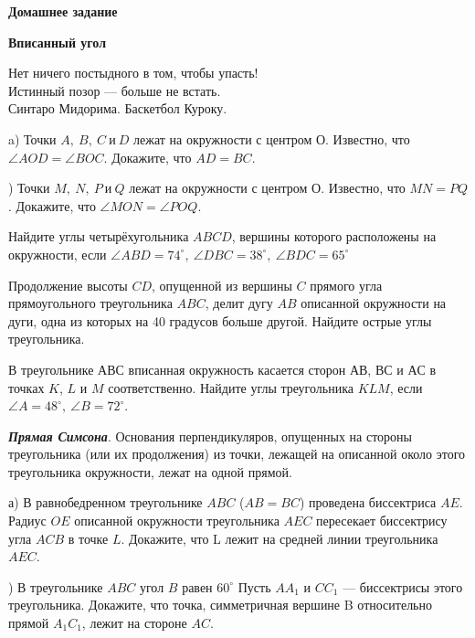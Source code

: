 \centerline{\bf \Huge Домашнее задание}
\centerline{\bf \Huge Вписанный угол}

\begin{flushright}
        \scriptsize{Нет ничего постыдного в том, чтобы упасть!\\ Истинный позор — больше не встать.\\ Синтаро Мидорима. Баскетбол Куроку.}
\end{flushright}

a) Точки $A,\ B,\ C\ \text{и}\ D$ лежат на окружности с центром О. Известно, что $\angle AOD = \angle BOC.$
Докажите, что $AD = BC$.

) Точки $M,\ N,\ P\ \text{и}\ Q$ лежат на окружности с центром О. Известно, что $MN = PQ$.
Докажите, что $\angle MON = \angle POQ.$

 Найдите углы четырёхугольника $ABCD$, вершины которого расположены на окружности, если $\angle ABD = 74^{\circ},\ \angle DBC = 38^{\circ},\ \angle BDC = 65^{\circ}$

  Продолжение высоты $CD$, опущенной из вершины $C$ прямого угла прямоугольного
треугольника $ABC$, делит дугу $AB$ описанной окружности на дуги, одна из которых на 40 градусов
больше другой. Найдите острые углы треугольника.

В треугольнике $АВС$ вписанная окружность касается сторон $АВ$, $ВС$ и $АС$ в точках $K$,
$L$ и $M$ соответственно. Найдите углы треугольника $KLM$, если $\angle A = 48^{\circ},\ \angle B = 72^{\circ}.$

\textbf{\textit{Прямая Симсона}}. Основания перпендикуляров, опущенных на стороны треугольника (или их продолжения) из точки, лежащей на описанной около этого треугольника окружности, лежат на одной прямой.

а) В равнобедренном треугольнике $ABC$ ($AB = BC$) проведена биссектриса $AE$. Радиус $OE$
описанной окружности треугольника $AEC$ пересекает биссектрису угла $ACB$ в точке $L$. Докажите, что L лежит на средней линии треугольника $AEC$.

) В треугольнике $ABC$ угол $B$ равен $60^{\circ}$ Пусть $AA_1$ и $CC_1$ — биссектрисы этого треугольника. Докажите, что точка, симметричная вершине B относительно прямой $A_1C_1$, лежит на стороне $AC$.